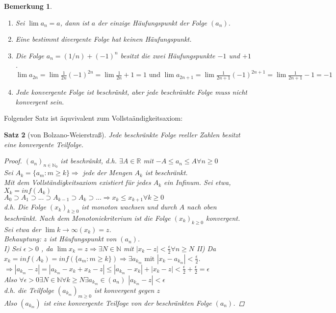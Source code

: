 \documentclass[a4paper,titlepage,oneside]{article}
\def\N{\ensuremath{\mathbb{N}} }
\def\R{\ensuremath{\mathbb{R}} }
\newcommand{\abs}[1]{\ensuremath{\left|#1\right|}}
\def\toinf{\ensuremath{\rightarrow \infty}}
\theoremstyle{thmstyle}
\newtheorem{satz}{Satz}[subsection]
\newtheorem{bem}[satz]{Bemerkung}
\begin{document}
\begin{bem}
\begin{enumerate}
\item Sei $\lim{a_n} = a$, dann ist $a$ der einzige Häufungspunkt der Folge $(a_n)$.
\item Eine bestimmt divergente Folge hat keinen Häufungspunkt.
\item Die Folge $a_n = (1/n)+ (-1)^n$ besitzt die zwei Häufungspunkte $-1$ und $+1$. $\lim{a_{2n}} = \lim{\frac{1}{2n} (-1)^{2n}} = \lim{\frac{1}{2n}} + 1 = 1 \text{ und } \lim{a_{2n+1}} = \lim{\frac{1}{2n+1} (-1)^{2n+1}} = \lim{\frac{1}{2n+1}} - 1 = - 1$
\item Jede konvergente Folge ist beschränkt, aber jede beschränkte Folge muss nicht konvergent sein.
\end{enumerate}
\end{bem}

Folgender Satz ist äquvivalent zum Vollstaändigkeitsaxiom:
\begin{satz}[von Bolzano-Weierstraß]
Jede beschränkte Folge reeller Zahlen besitzt eine konvergente Teilfolge.
\begin{proof}
\((a_n)_{n \in \N_0} \) ist beschränkt, d.h. $\exists A \in \R$ mit $-A \le a_n \le A \forall n \ge 0$\\
Sei $A_k = \{ a_m : m \ge k\} \Rightarrow$ jede der Mengen $A_k$ ist beschränkt.\\
Mit dem Vollständigkeitsaxiom existiert für jedes $A_k$ ein Infinum. Sei etwa, $X_k = inf(A_k)$\\
$A_0 \supset A_1 \supset ... \supset A_{k-1} \supset A_k \supset ... \Rightarrow x_k \le x_{k+1} \forall k \ge 0$\\
d.h. Die Folge $(x_k)_{k \ge 0}$ ist monoton wachsen und durch $A$ nach oben beschränkt. Nach dem Monotoniekriterium ist die Folge $(x_k)_{k \ge 0}$ konvergent.
Sei etwa der $\lim\limits{k \toinf}(x_k) = z$. \\
Behauptung: $z$ ist Häufungspunkt von $(a_n)$.\\
I) Sei $\epsilon > 0$ , da $\lim{x_k} = z \Rightarrow \exists N \in \N$ mit $\abs{x_k - z} < \frac{\epsilon}{2} \forall n \ge N$
II) Da $x_k = inf(A_k) = inf(\{a_m : m \ge k\}) \Rightarrow \exists a_{k_m} \text{ mit } \abs{x_k - a_{k_m}} < \frac{\epsilon}{2}$.
$\Rightarrow \abs{a_{k_m} - z} = \abs{a_{k_m} - x_k + x_k - z} \le  \abs{a_{k_m} - x_k} + \abs{x_k  -z} < \frac{\epsilon}{2} + \frac{\epsilon}{2} = \epsilon$\\
Also $\forall \epsilon > 0 \exists N \in \N \forall k \ge N\exists a_{k_m} \in (a_n)$
$\abs{a_{k_m} - z} < \epsilon$\\
d.h. die Teilfolge $(a_{k_m})_{m\ge 0}$ ist konvergent gegen $z$\\
Also $(a_{k_m})$ ist eine konvergente Teilfoge von der beschränkten Folge $(a_n)$.
\end{proof}
\end{satz}
\end{document}
